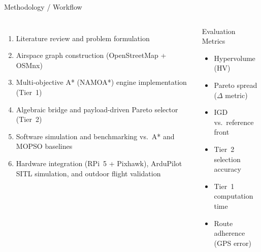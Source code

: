 \documentclass[aspectratio=169,11pt]{beamer}
\begin{document}
\begin{frame}{Methodology / Workflow}
  \begin{columns}[T,onlytextwidth]
      \begin{enumerate}
        \item Literature review and problem formulation
        \item Airspace graph construction (OpenStreetMap + OSMnx)
        \item Multi-objective A* (NAMOA*) engine implementation (Tier~1)
        \item Algebraic bridge and payload-driven Pareto selector (Tier~2)
        \item Software simulation and benchmarking vs.\ A* and MOPSO baselines
        \item Hardware integration (RPi~5 + Pixhawk), ArduPilot SITL
              simulation, and outdoor flight validation
      \end{enumerate}
      \begin{block}{Evaluation Metrics}
        \begin{itemize}
          \item Hypervolume (HV)
          \item Pareto spread ($\Delta$ metric)
          \item IGD vs.\ reference front
          \item Tier~2 selection accuracy
          \item Tier~1 computation time
          \item Route adherence (GPS error)
        \end{itemize}
      \end{block}
  \end{columns}
\end{frame}
\end{document}
